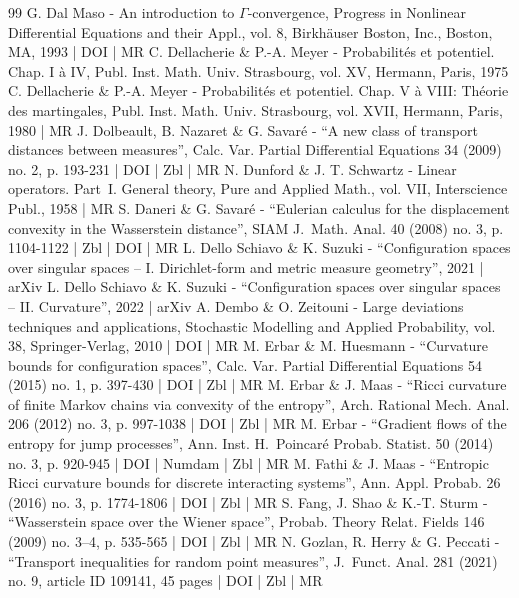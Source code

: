 \begin{thebibliography}{99}
G. Dal Maso - An introduction to $\Gamma $-convergence, Progress in Nonlinear Differential Equations and their Appl., vol. 8, Birkhäuser Boston, Inc., Boston, MA, 1993 | DOI | MR
C. Dellacherie \& P.-A. Meyer - Probabilités et potentiel. Chap. I à IV, Publ. Inst. Math. Univ. Strasbourg, vol. XV, Hermann, Paris, 1975
C. Dellacherie \& P.-A. Meyer - Probabilités et potentiel. Chap. V à VIII: Théorie des martingales, Publ. Inst. Math. Univ. Strasbourg, vol. XVII, Hermann, Paris, 1980 | MR
J. Dolbeault, B. Nazaret \& G. Savaré - “A new class of transport distances between measures”, Calc. Var. Partial Differential Equations 34 (2009) no. 2, p. 193-231 | DOI | Zbl | MR
N. Dunford \& J. T. Schwartz - Linear operators. Part I. General theory, Pure and Applied Math., vol. VII, Interscience Publ., 1958 | MR
S. Daneri \& G. Savaré - “Eulerian calculus for the displacement convexity in the Wasserstein distance”, SIAM J. Math. Anal. 40 (2008) no. 3, p. 1104-1122 | Zbl | DOI | MR
L. Dello Schiavo \& K. Suzuki - “Configuration spaces over singular spaces – I. Dirichlet-form and metric measure geometry”, 2021 | arXiv
L. Dello Schiavo \& K. Suzuki - “Configuration spaces over singular spaces – II. Curvature”, 2022 | arXiv
A. Dembo \& O. Zeitouni - Large deviations techniques and applications, Stochastic Modelling and Applied Probability, vol. 38, Springer-Verlag, 2010 | DOI | MR
M. Erbar \& M. Huesmann - “Curvature bounds for configuration spaces”, Calc. Var. Partial Differential Equations 54 (2015) no. 1, p. 397-430 | DOI | Zbl | MR
M. Erbar \& J. Maas - “Ricci curvature of finite Markov chains via convexity of the entropy”, Arch. Rational Mech. Anal. 206 (2012) no. 3, p. 997-1038 | DOI | Zbl | MR
M. Erbar - “Gradient flows of the entropy for jump processes”, Ann. Inst. H. Poincaré Probab. Statist. 50 (2014) no. 3, p. 920-945 | DOI | Numdam | Zbl | MR
M. Fathi \& J. Maas - “Entropic Ricci curvature bounds for discrete interacting systems”, Ann. Appl. Probab. 26 (2016) no. 3, p. 1774-1806 | DOI | Zbl | MR
S. Fang, J. Shao \& K.-T. Sturm - “Wasserstein space over the Wiener space”, Probab. Theory Relat. Fields 146 (2009) no. 3–4, p. 535-565 | DOI | Zbl | MR
N. Gozlan, R. Herry \& G. Peccati - “Transport inequalities for random point measures”, J. Funct. Anal. 281 (2021) no. 9, article ID 109141, 45 pages | DOI | Zbl | MR

\end{thebibliography}
